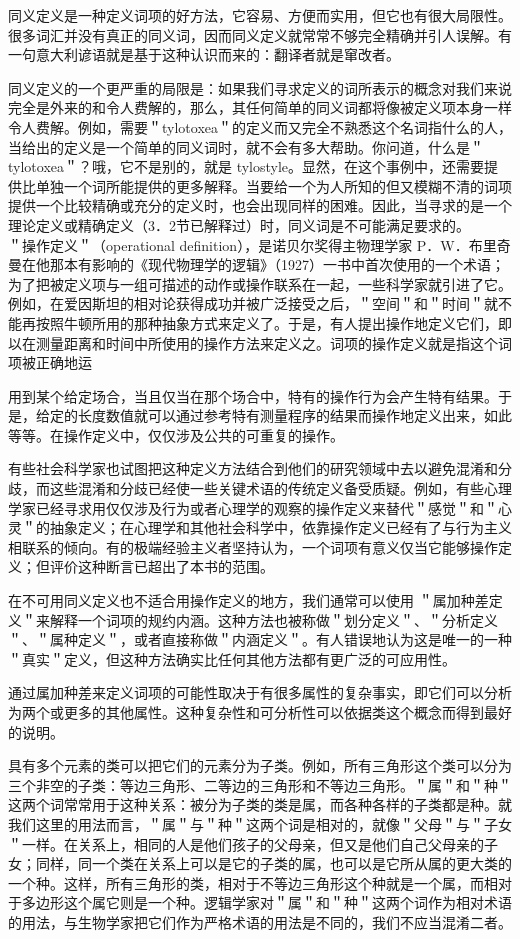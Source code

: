同义定义是一种定义词项的好方法，它容易、方便而实用，但它也有很大局限性。很多词汇并没有真正的同义词，因而同义定义就常常不够完全精确并引人误解。有一句意大利谚语就是基于这种认识而来的：翻译者就是窜改者。

同义定义的一个更严重的局限是：如果我们寻求定义的词所表示的概念对我们来说完全是外来的和令人费解的，那么，其任何简单的同义词都将像被定义项本身一样令人费解。例如，需要＂tylotoxea＂的定义而又完全不熟悉这个名词指什么的人，当给出的定义是一个简单的同义词时，就不会有多大帮助。你问道，什么是＂tylotoxea＂？哦，它不是别的，就是 tylostyle。显然，在这个事例中，还需要提供比单独一个词所能提供的更多解释。当要给一个为人所知的但又模糊不清的词项提供一个比较精确或充分的定义时，也会出现同样的困难。因此，当寻求的是一个理论定义或精确定义（3．2节已解释过）时，同义词是不可能满足要求的。\\
＂操作定义＂（operational definition），是诺贝尔奖得主物理学家 P．W．布里奇曼在他那本有影响的《现代物理学的逻辑》（1927）一书中首次使用的一个术语；为了把被定义项与一组可描述的动作或操作联系在一起，一些科学家就引进了它。例如，在爱因斯坦的相对论获得成功并被广泛接受之后，＂空间＂和＂时间＂就不能再按照牛顿所用的那种抽象方式来定义了。于是，有人提出操作地定义它们，即以在测量距离和时间中所使用的操作方法来定义之。词项的操作定义就是指这个词项被正确地运

用到某个给定场合，当且仅当在那个场合中，特有的操作行为会产生特有结果。于是，给定的长度数值就可以通过参考特有测量程序的结果而操作地定义出来，如此等等。在操作定义中，仅仅涉及公共的可重复的操作。

有些社会科学家也试图把这种定义方法结合到他们的研究领域中去以避免混淆和分歧，而这些混淆和分歧已经使一些关键术语的传统定义备受质疑。例如，有些心理学家已经寻求用仅仅涉及行为或者心理学的观察的操作定义来替代＂感觉＂和＂心灵＂的抽象定义；在心理学和其他社会科学中，依靠操作定义已经有了与行为主义相联系的倾向。有的极端经验主义者坚持认为，一个词项有意义仅当它能够操作定义；但评价这种断言已超出了本书的范围。

在不可用同义定义也不适合用操作定义的地方，我们通常可以使用 ＂属加种差定义＂来解释一个词项的规约内涵。这种方法也被称做＂划分定义＂、＂分析定义＂、＂属种定义＂，或者直接称做＂内涵定义＂。有人错误地认为这是唯一的一种＂真实＂定义，但这种方法确实比任何其他方法都有更广泛的可应用性。

通过属加种差来定义词项的可能性取决于有很多属性的复杂事实，即它们可以分析为两个或更多的其他属性。这种复杂性和可分析性可以依据类这个概念而得到最好的说明。

具有多个元素的类可以把它们的元素分为子类。例如，所有三角形这个类可以分为三个非空的子类：等边三角形、二等边的三角形和不等边三角形。＂属＂和＂种＂这两个词常常用于这种关系：被分为子类的类是属，而各种各样的子类都是种。就我们这里的用法而言，＂属＂与＂种＂这两个词是相对的，就像＂父母＂与＂子女＂一样。在关系上，相同的人是他们孩子的父母亲，但又是他们自己父母亲的子女；同样，同一个类在关系上可以是它的子类的属，也可以是它所从属的更大类的一个种。这样，所有三角形的类，相对于不等边三角形这个种就是一个属，而相对于多边形这个属它则是一个种。逻辑学家对＂属＂和＂种＂这两个词作为相对术语的用法，与生物学家把它们作为严格术语的用法是不同的，我们不应当混淆二者。

